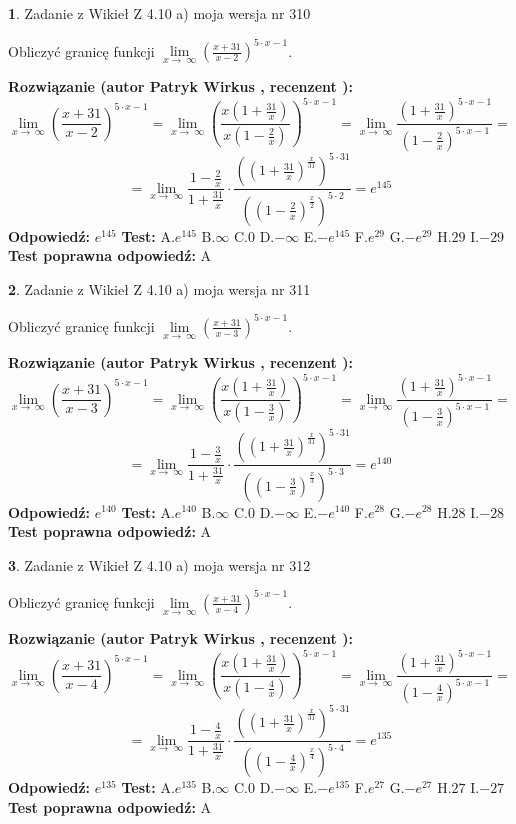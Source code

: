 \documentclass[12pt, a4paper]{article}
\theoremstyle{definition} %
\newtheorem{zad}{}
\newcommand{\zadStart}[1]{\begin{zad}#1\newline}
\newcommand{\zadStop}{\end{zad}}
\newcommand{\rozwStart}[2]{\noindent \textbf{Rozwiązanie (autor #1 , recenzent #2): }\newline}
\newcommand{\rozwStop}{\newline}
\newcommand{\odpStart}{\noindent \textbf{Odpowiedź:}\newline}
\newcommand{\odpStop}{\newline}
\newcommand{\testStart}{\noindent \textbf{Test:}\newline}
\newcommand{\testStop}{\newline}
\newcommand{\kluczStart}{\noindent \textbf{Test poprawna odpowiedź:}\newline}
\newcommand{\kluczStop}{\newline}
\begin{document}
\zadStart{Zadanie z Wikieł Z 4.10 a) moja wersja nr 310}

Obliczyć granicę funkcji  $\lim\limits_{x\to\ \infty}(\frac{x+31}{x-2})^{5\cdot x-1}$.
\zadStop
\rozwStart{Patryk Wirkus}{}
$$\lim\limits_{x\to\ \infty}(\frac{x+31}{x-2})^{5\cdot x-1} = \lim\limits_{x\to\ \infty}(\frac{x(1+\frac{31}{x})}{x(1-\frac{2}{x})})^{5\cdot x-1}=\lim\limits_{x\to\ \infty}\frac{(1+\frac{31}{x})^{5\cdot x-1}}{(1-\frac{2}{x})^{5\cdot x-1}}=$$
$$=\lim\limits_{x\to\ \infty}\frac{1-\frac{2}{x}}{1+\frac{31}{x}}\cdot\frac{((1+\frac{31}{x})^{\frac{x}{31}})^{5\cdot31}}{((1-\frac{2}{x})^{\frac{x}{2}})^{5\cdot2}}=e^{145}$$
\rozwStop
\odpStart
$e^{145}$
\odpStop
\testStart
A.$e^{145}$ B.$\infty$ C.$0$ D.$-\infty$ E.$-e^{145}$
F.$e^{29}$ G.$-e^{29}$
H.$29$
I.$-29$
\testStop
\kluczStart
A
\kluczStop



\zadStart{Zadanie z Wikieł Z 4.10 a) moja wersja nr 311}

Obliczyć granicę funkcji  $\lim\limits_{x\to\ \infty}(\frac{x+31}{x-3})^{5\cdot x-1}$.
\zadStop
\rozwStart{Patryk Wirkus}{}
$$\lim\limits_{x\to\ \infty}(\frac{x+31}{x-3})^{5\cdot x-1} = \lim\limits_{x\to\ \infty}(\frac{x(1+\frac{31}{x})}{x(1-\frac{3}{x})})^{5\cdot x-1}=\lim\limits_{x\to\ \infty}\frac{(1+\frac{31}{x})^{5\cdot x-1}}{(1-\frac{3}{x})^{5\cdot x-1}}=$$
$$=\lim\limits_{x\to\ \infty}\frac{1-\frac{3}{x}}{1+\frac{31}{x}}\cdot\frac{((1+\frac{31}{x})^{\frac{x}{31}})^{5\cdot31}}{((1-\frac{3}{x})^{\frac{x}{3}})^{5\cdot3}}=e^{140}$$
\rozwStop
\odpStart
$e^{140}$
\odpStop
\testStart
A.$e^{140}$ B.$\infty$ C.$0$ D.$-\infty$ E.$-e^{140}$
F.$e^{28}$ G.$-e^{28}$
H.$28$
I.$-28$
\testStop
\kluczStart
A
\kluczStop



\zadStart{Zadanie z Wikieł Z 4.10 a) moja wersja nr 312}

Obliczyć granicę funkcji  $\lim\limits_{x\to\ \infty}(\frac{x+31}{x-4})^{5\cdot x-1}$.
\zadStop
\rozwStart{Patryk Wirkus}{}
$$\lim\limits_{x\to\ \infty}(\frac{x+31}{x-4})^{5\cdot x-1} = \lim\limits_{x\to\ \infty}(\frac{x(1+\frac{31}{x})}{x(1-\frac{4}{x})})^{5\cdot x-1}=\lim\limits_{x\to\ \infty}\frac{(1+\frac{31}{x})^{5\cdot x-1}}{(1-\frac{4}{x})^{5\cdot x-1}}=$$
$$=\lim\limits_{x\to\ \infty}\frac{1-\frac{4}{x}}{1+\frac{31}{x}}\cdot\frac{((1+\frac{31}{x})^{\frac{x}{31}})^{5\cdot31}}{((1-\frac{4}{x})^{\frac{x}{4}})^{5\cdot4}}=e^{135}$$
\rozwStop
\odpStart
$e^{135}$
\odpStop
\testStart
A.$e^{135}$ B.$\infty$ C.$0$ D.$-\infty$ E.$-e^{135}$
F.$e^{27}$ G.$-e^{27}$
H.$27$
I.$-27$
\testStop
\kluczStart
A
\kluczStop
\end{document}
